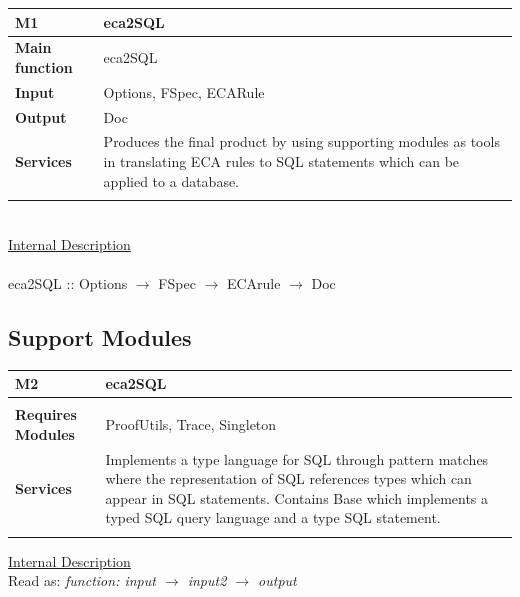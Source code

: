 \documentclass[12pt]{article}
\begin{document}
{\setlength{\tabcolsep}{6pt} 
    \begin{tabularx}{\textwidth}{>{\bfseries}m{3cm}X}
        M1 & eca2SQL \\ 
        \midrule 
        Main function & eca2SQL
        \\  Input & Options, FSpec, ECARule
        \\  Output & Doc
        \\	Services & Produces the final product by using supporting modules 
        as tools in translating ECA rules to SQL statements which can be 
        applied to a database.
        \\     
         \vspace{12pt}
     \end{tabularx}
\\
\underline{Internal Description}\\ \\
eca2SQL :: Options $\rightarrow$ FSpec $\rightarrow$ ECArule $\rightarrow$ Doc

\subsection{Support Modules}

{\setlength{\tabcolsep}{6pt} 
    \begin{tabularx}{\textwidth}{>{\bfseries}m{4cm}X}
        M2 & eca2SQL \\ 
        \midrule       
        \\  Requires Modules & ProofUtils, Trace, Singleton
        \\	Services & Implements a type language for SQL through pattern 
        matches where the representation of SQL references types which can 
        appear in SQL statements. Contains Base which implements a typed SQL query 
        language and a type SQL statement.
        \\         
        \vspace{12pt}
    \end{tabularx} 


\setlength{\parindent}{0pt}
\underline{Internal Description}\\

Read as: \textit{function: input $\rightarrow$ input2 $\rightarrow$ 
output}\newline

}}
\end{document}
